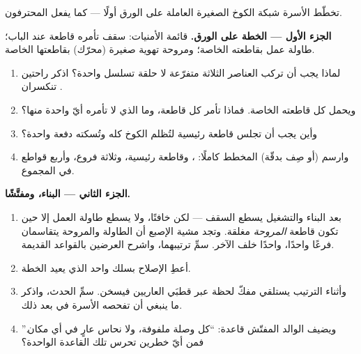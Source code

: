\begin{problem}\label{pb:g6:circuits-and-safety:1}
تخطّط الأسرة شبكة الكوخ الصغيرة العاملة  على الورق
أولًا --- كما يفعل المحترفون.

\medskip\noindent\textbf{الجزء الأول --- الخطة على الورق.}
قائمة الأمنيات:  سقف تأمره قاطعة عند الباب؛  طاولة
عمل بقاطعته الخاصة؛ ومروحة تهوية صغيرة (محرّك) بقاطعتها
الخاصة.
\begin{enumerate}
  \item لماذا يجب أن تركب العناصر الثلاثة  متفرّعة لا
        حلقة تسلسل واحدة؟ اذكر راحتين تنكسران .
  \item ويحمل كل  قاطعته الخاصة. فماذا تأمر كل قاطعة، وما
        الذي لا تأمره أيّ واحدة منها؟
  \item وأين يجب أن تجلس قاطعة رئيسية لتُظلم الكوخ كله وتُسكته
        دفعة واحدة؟
  \item وارسم (أو صِف بدقّة) المخطط كاملًا: ، وقاطعة
        رئيسية، وثلاثة فروع، وأربع قواطع في المجموع.
\end{enumerate}

\medskip\noindent\textbf{الجزء الثاني --- البناء، ومفتَّشًا.}
\begin{enumerate}[resume]
  \item بعد البناء والتشغيل يسطع  السقف --- لكن خافتًا،
        ولا يسطع  طاولة العمل إلا حين تكون قاطعة
        \emph{المروحة} مغلقة. وتجد مشية الإصبع أن  الطاولة
        والمروحة يتقاسمان فرعًا واحدًا، واحدًا خلف الآخر. سمِّ
        ترتيبهما، واشرح العرضين بالقواعد القديمة.
  \item أعطِ الإصلاح بسلك واحد الذي يعيد الخطة.
  \item وأثناء الترتيب يستلقي مفكّ لحظة عبر قطبَي 
        العاريين فيسخن. سمِّ الحدث، واذكر ما ينبغي أن تفحصه
        الأسرة في  بعد ذلك.
  \item ويضيف الوالد المفتّش قاعدة: ``كل وصلة ملفوفة، ولا نحاس
        عارٍ في أي مكان.'' فمن أيّ خطرين تحرس تلك القاعدة
        الواحدة؟
\end{enumerate}


\end{problem}
